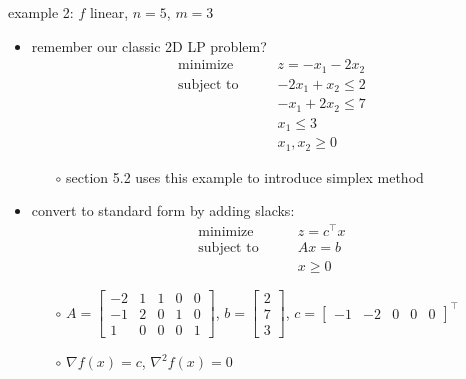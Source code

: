 \documentclass[10pt,hyperref,dvipsnames]{beamer}
\newcommand{\grad}{\nabla}
\newcommand{\ds}{\displaystyle}
\begin{document}
\begin{frame}{example 2: $f$ linear, $n=5$, $m=3$}

\begin{itemize}
\item remember our classic 2D LP problem?
\begin{equation*}
\begin{matrix}
\text{minimize} \qquad & z = -x_1 - 2x_2 \\
\text{subject to} \qquad & -2x_1 + x_2 \le 2 \\
 & -x_1 + 2x_2 \le 7 \\
 & x_1 \le 3 \\
 & x_1, x_2 \ge 0
\end{matrix}
\end{equation*}

    \begin{itemize}
    \item[$\circ$] section 5.2 uses this example to introduce simplex method
    \end{itemize}

\medskip
\item convert to standard form by adding slacks:
\begin{equation*}
\begin{matrix}
\text{minimize} \qquad & z = c^\top x \\
\text{subject to} \qquad & A x = b \\
 & x \ge 0
\end{matrix}
\end{equation*}

    \begin{itemize}
    \item[$\circ$] $\ds A = \begin{bmatrix} -2 & 1 & 1 & 0 & 0 \\ -1 & 2 & 0 & 1 & 0 \\ 1 & 0 & 0 & 0 & 1 \end{bmatrix}$, $\ds b = \begin{bmatrix} 2 \\ 7 \\ 3 \end{bmatrix}$, $c = \begin{bmatrix} -1 & -2 & 0 & 0 & 0 \end{bmatrix}^\top$
    \item[$\circ$] $\grad f(x) = c$, \quad $\grad^2 f(x)=0$
    \end{itemize}
\end{itemize}
\end{frame}
\end{document}
